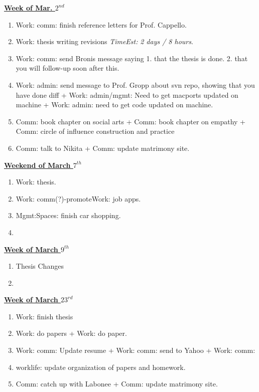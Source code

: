 \documentclass[11pt]{article}
\newcommand{\te}[1]{\textit{TimeEst:} \textit{#1}}
\begin{document}
{\small \underline{\textbf{Week of Mar. $2^{nd}$}} }\\
\begin{enumerate} 
\item \small Work: comm: finish reference letters for Prof. Cappello.  
\item \small Work: thesis writing revisions \te {2 days / 8
  hours}. 
\item \small Work: comm: send Bronis message saying
  1. that the thesis is done.  2. that you will follow-up
  soon after this.
\item \small Work: admin: send message to Prof. Gropp about
  svn repo, showing that you have done diff   + Work:
  admin/mgmt: Need to get macports updated on machine +
  Work: admin: need to get code updated on machine. 
\item \small Comm: book chapter on social arts + Comm: book
  chapter on empathy + Comm: circle of influence construction and
  practice 
\item \small Comm: talk to Nikita + Comm: update matrimony site. 
\end{enumerate}


{\small \underline{\textbf{Weekend of March $7^{th}$}}}\\
\begin{enumerate} 
  \small \item \small Work: thesis. 
\item \small Work: comm(?)-promoteWork: job apps. 
\item \small Mgmt:Spaces: finish car shopping.
\item \small 
\end{enumerate} 

{\small \underline{\textbf{Week of March $9^{th}$}}}\\  
\begin{enumerate} 
  \small \item \small Thesis Changes  
\item \small 
\end{enumerate} 

{\small \underline{\textbf{Week of March $23^{rd}$}}}\\  
\begin{enumerate} 
  \small \item \small Work: finish thesis 
  \small \item \small Work: do papers + Work: do paper. 
  \small \item \small Work: comm: Update resume  + Work: comm: send to
  Yahoo + Work: comm: 
\item \small worklife: update organization of papers and homework. 
\item \small Comm: catch up with Labonee + Comm: update matrimony
  site. 
\end{enumerate} 
\end{document}
